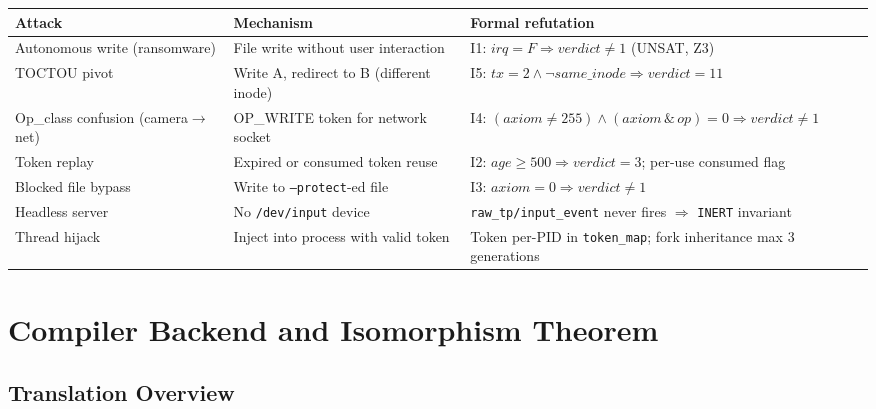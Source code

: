 \documentclass[11pt,a4paper,twoside]{article}
\begin{document}
\begin{longtable}{@{}p{3.2cm}p{3.8cm}p{5.4cm}@{}}
\toprule
\textbf{Attack} & \textbf{Mechanism} & \textbf{Formal refutation} \\ \midrule
\endhead \bottomrule \endfoot
Autonomous write (ransomware)
  & File write without user interaction
  & I1: $\mathit{irq}{=}F \Rightarrow \mathit{verdict}{\neq}1$ (UNSAT, Z3) \\[3pt]
TOCTOU pivot
  & Write A, redirect to B (different inode)
  & I5: $\mathit{tx}{=}2 \wedge \neg\mathit{same\_inode} \Rightarrow \mathit{verdict}{=}11$ \\[3pt]
Op\_class confusion (camera${\to}$net)
  & OP\_WRITE token for network socket
  & I4: $(\mathit{axiom}{\neq}255) \wedge (\mathit{axiom}\,\&\,\mathit{op}){=}0 \Rightarrow \mathit{verdict}{\neq}1$ \\[3pt]
Token replay
  & Expired or consumed token reuse
  & I2: $\mathit{age}{\geq}500 \Rightarrow \mathit{verdict}{=}3$; per-use consumed flag \\[3pt]
Blocked file bypass
  & Write to \texttt{--protect}-ed file
  & I3: $\mathit{axiom}{=}0 \Rightarrow \mathit{verdict}{\neq}1$ \\[3pt]
Headless server
  & No \texttt{/dev/input} device
  & \texttt{raw\_tp/input\_event} never fires $\Rightarrow$ \texttt{INERT} invariant \\[3pt]
Thread hijack
  & Inject into process with valid token
  & Token per-PID in \texttt{token\_map}; fork inheritance max 3 generations \\
\end{longtable}

\section{Compiler Backend and Isomorphism Theorem}

\subsection{Translation Overview}
\end{document}
